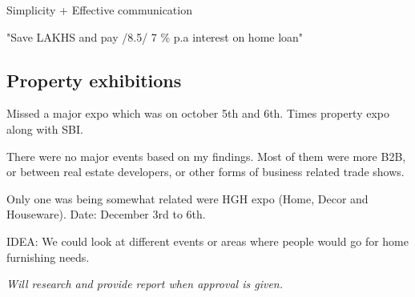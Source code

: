 \documentclass[12pt, a4paper]{article}
\begin{document}
Simplicity + Effective communication

\vspace{0.3cm}

"Save LAKHS and pay /8.5/ 7 \% p.a interest on home loan"

\subsection{Property exhibitions}

Missed a major expo which was on october 5th and 6th. Times property expo along with SBI.

\noindent There were no major events based on my findings. Most of them were more B2B, or between real estate developers, or other forms of business related trade shows.

\noindent Only one was being somewhat related were HGH expo (Home, Decor and Houseware). Date: December 3rd to 6th.

\vspace{0.5cm}

\noindent IDEA: We could look at different events or areas where people would go for home furnishing needs.

\vspace{0.25cm}


\textit{Will research and provide report when approval is given.}
\end{document}
